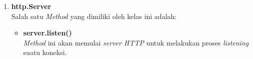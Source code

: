 \begin{enumerate}
	\item \textbf{http.Server} \\ 
%		
%	
%		
%		
%	
	Salah satu \textit{Method} yang dimiliki oleh kelas ini adalah:
	\begin{itemize}
		\item \textbf{server.listen()} \\ \textit{Method} ini akan memulai \textit{server HTTP} untuk melakukan proses \textit{listening} suatu koneksi.
	\end{itemize}
%		
%		
%		
\end{enumerate} 

